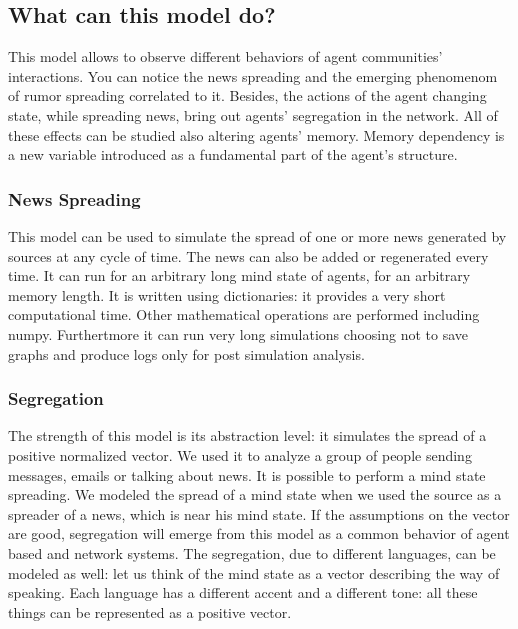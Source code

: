 \subsection{What can this model do?}\label{subsec:whatcanthismodeldo}
This model allows to observe different behaviors of agent communities'
interactions.
You can notice the news spreading and the emerging phenomenom of rumor
spreading correlated to it.
Besides, the actions of the agent changing state, while spreading news, bring
out agents' segregation in the network.
All of these effects can be studied also altering agents' memory.
Memory dependency is a new variable introduced as a fundamental
part of the agent's structure.

\subsubsection{News Spreading}\label{subsec:newsspreading}
This model can be used to simulate the spread of one or more news generated
by sources at any cycle of time. The news can also be added or regenerated
every time. It can run for an arbitrary long mind state of agents,
for an arbitrary memory length.
It is written using dictionaries: it provides a very short computational time.
Other mathematical operations are performed including numpy.
Furthertmore it can run very long simulations choosing not to save graphs
and produce logs only for post simulation analysis.

\subsubsection{Segregation}\label{subsec:segregation}
The strength of this model is its abstraction level: it simulates the
spread of a positive normalized vector.
We used it to analyze a group of people sending messages, emails or
talking about news.
It is possible to perform a mind state spreading.
We modeled the spread of a mind state when we used the source as a spreader
of a news, which is near his mind state.
If the assumptions on the vector are good, segregation will emerge from
this model as a common behavior of agent based and network systems.
The segregation, due to different languages, can be modeled as well:
let us think of the mind state as a vector describing the way of speaking.
Each language has a different accent and a different tone: all these things
can be represented as a positive vector.
